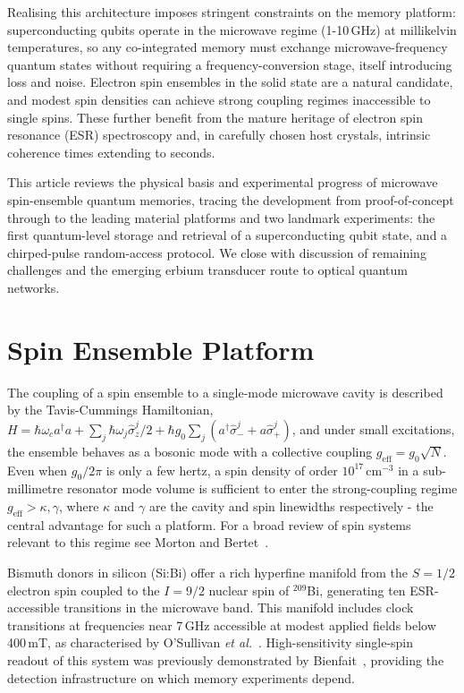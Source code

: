 \documentclass[technote]{IEEEtran}
\begin{document}
Realising this architecture imposes stringent constraints on the memory platform: superconducting qubits operate in the microwave regime (1-10\,GHz) at millikelvin temperatures, so any co-integrated memory must exchange microwave-frequency quantum states without requiring a frequency-conversion stage, itself introducing loss and noise. Electron spin ensembles in the solid state are a natural candidate, and modest spin densities can achieve strong coupling regimes inaccessible to single spins. These further benefit from the mature heritage of electron spin resonance (ESR) spectroscopy and, in carefully chosen host crystals, intrinsic coherence times extending to seconds.

This article reviews the physical basis and experimental progress of microwave spin-ensemble quantum memories, tracing the development from proof-of-concept through to the leading material platforms and two landmark experiments: the first quantum-level storage and retrieval of a superconducting qubit state, and a chirped-pulse random-access protocol. We close with discussion of remaining challenges and the emerging erbium transducer route to optical quantum networks.


\section{Spin Ensemble Platform}
\label{sec:platform}

The coupling of a spin ensemble to a single-mode microwave cavity is described by the Tavis-Cummings Hamiltonian, $H = \hbar\omega_c a^\dagger a + \sum_j \hbar\omega_j \hat{\sigma}_z^j/2 + \hbar g_0 \sum_j (a^\dagger \hat{\sigma}_-^j + a\hat{\sigma}_+^j)$, and under small excitations, the ensemble behaves as a bosonic mode with a collective coupling $g_\mathrm{eff} = g_0\sqrt{N}$. Even when $g_0/2\pi$ is only a few hertz, a spin density of order $10^{17}$\,cm$^{-3}$ in a sub-millimetre resonator mode volume is sufficient to enter the strong-coupling regime $g_\mathrm{eff} > \kappa, \gamma$, where $\kappa$ and $\gamma$ are the cavity and spin linewidths respectively - the central advantage for such a platform. For a broad review of spin systems relevant to this regime see Morton and Bertet~\cite{morton2018}.

Bismuth donors in silicon (Si:Bi) offer a rich hyperfine manifold from the $S = 1/2$ electron spin coupled to the $I = 9/2$ nuclear spin of $^{209}$Bi, generating ten ESR-accessible transitions in the microwave band. This manifold includes clock transitions at frequencies near 7\,GHz accessible at modest applied fields below 400\,mT, as characterised by O'Sullivan \textit{et al.}~\cite{O_sullivan_2020}. High-sensitivity single-spin readout of this system was previously demonstrated by Bienfait~\cite{Bienfait2016-zl}, providing the detection infrastructure on which memory experiments depend.
\end{document}
